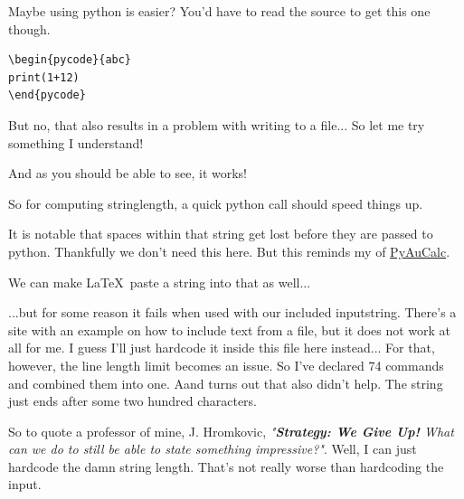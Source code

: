 \documentclass{article} \usepackage[utf8]{inputenc}
\makeatletter
\newenvironment{pycode}[1]%
{\xdef\d@tn@me{#1}\xdef\r@ncmd{python #1.py > #1.plog}%
\typeout{Writing file #1}\VerbatimOut{#1.py}%
}
{\endVerbatimOut %
\toks0{\immediate\write18}%
\expandafter\toks\expandafter1\expandafter{\r@ncmd}%
 \edef\d@r@ncmd{\the\toks0{\the\toks1}}\d@r@ncmd %
 \noindent Input
 \inputminted{python}{\d@tn@me.py}%
 \noindent Output
 \inputminted{text}{\d@tn@me.plog}%
 }
\makeatother
\begin{document}
Maybe using python is easier? You'd have to read the source to get this one though.
\begin{lstlisting}
\begin{pycode}{abc}
print(1+12)
\end{pycode}
\end{lstlisting}
But no, that also results in a problem with writing to a file... So let me try something I understand!
\begin{mycode}

\end{mycode}

\newline
And as you should be able to see, it works!

So for computing stringlength, a quick python call should speed things up.
\begin{mycode}

\end{mycode}

\newline
It is notable that spaces within that string get lost before they are passed to python. Thankfully we don't need this here. But this reminds my of \href{https://ctftime.org/writeup/21982}{PyAuCalc}.

We can make \LaTeX\, paste a string into that as well...

\begin{mycode}
\def\mystr{hello}
\def\mystrtwo{\mystr}

\end{mycode}
\def\mystr{hello}
\def\mystrtwo{\mystr}

...but for some reason it fails when used with our included inputstring. There's a site with an example on how to include text from a file, but it does not work at all for me. I guess I'll just hardcode it inside this file here instead... For that, however, the line length limit becomes an issue. So I've declared 74 commands and combined them into one. Aand turns out that also didn't help. The string just ends after some two hundred characters.

So to quote a professor of mine, J. Hromkovic, \textit{"\textbf{Strategy: We Give Up!} What can we do to still be able to state something impressive?"}.
Well, I can just hardcode the damn string length. That's not really worse than hardcoding the input.

\makeatletter
\def\einput#1{\@@input #1 \space}
\newcommand{\showexpanded}[1]{%
  \everyeof{\expandafter\@gobble\noexpand}%
  \long\edef\@tempcontents{#1}%
  \show\@tempcontents
}
\newcommand{\justexpanded}[1]{%
  \everyeof{\expandafter\@gobble\noexpand}%
  \long\edef\@tempcontents{#1}%
  \@tempcontents
}
\makeatother
\def\testingfile{\einput{testing.tex}}
%
\end{document}
